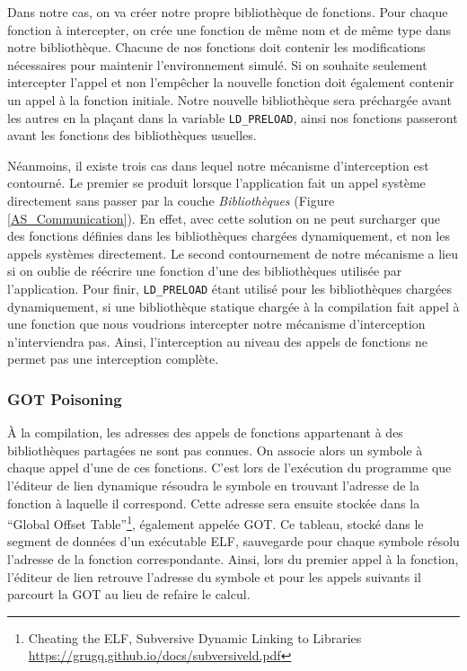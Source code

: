 Dans notre cas, on va créer notre propre bibliothèque de fonctions. Pour chaque
fonction à intercepter, on crée une fonction de même nom et de même type dans
notre bibliothèque. Chacune de nos fonctions doit contenir les modifications
nécessaires pour maintenir l'environnement simulé. Si on souhaite seulement
intercepter l'appel et non l'empêcher la nouvelle fonction doit également
contenir un appel à la fonction initiale. Notre nouvelle bibliothèque sera
préchargée avant les autres en la plaçant dans la variable \texttt{LD\_PRELOAD},
ainsi nos fonctions passeront avant les fonctions des bibliothèques usuelles.

Néanmoins, il existe trois cas dans lequel notre mécanisme d'interception est
contourné. Le premier se produit lorsque l'application fait un appel système
directement sans passer par la couche \textit{Bibliothèques} (Figure
\ref{AS_Communication}). En effet, avec cette solution on ne peut surcharger que
des fonctions définies dans les bibliothèques chargées dynamiquement, et non les
appels systèmes directement. Le second contournement de notre mécanisme a lieu
si on oublie de réécrire une fonction d'une des bibliothèques utilisée par
l'application. Pour finir, \texttt{LD\_PRELOAD} étant utilisé pour les
bibliothèques chargées dynamiquement, si une bibliothèque statique chargée à la
compilation fait appel à une fonction que nous voudrions intercepter notre
mécanisme d'interception n'interviendra pas. Ainsi, l'interception au niveau des
appels de fonctions ne permet pas une interception complète.

\subsubsection{GOT Poisoning}

À la compilation, les adresses des appels de fonctions appartenant à des bibliothèques partagées ne sont pas connues. On associe alors un symbole à chaque appel d'une de ces fonctions. C'est lors de l'exécution du programme que l'éditeur de lien dynamique résoudra le symbole en trouvant l'adresse de la fonction à laquelle il correspond. Cette adresse sera ensuite stockée dans la ``Global Offset Table''\footnote{Cheating the ELF, Subversive Dynamic Linking to Libraries \\ \url{https://grugq.github.io/docs/subversiveld.pdf}}, également appelée GOT. Ce tableau, stocké dans le segment de données d'un exécutable ELF, sauvegarde pour chaque symbole résolu l'adresse de la fonction correspondante. Ainsi, lors du premier appel à la fonction, l'éditeur de lien retrouve l'adresse du symbole et pour les appels suivants il parcourt la GOT au lieu de refaire le calcul.

